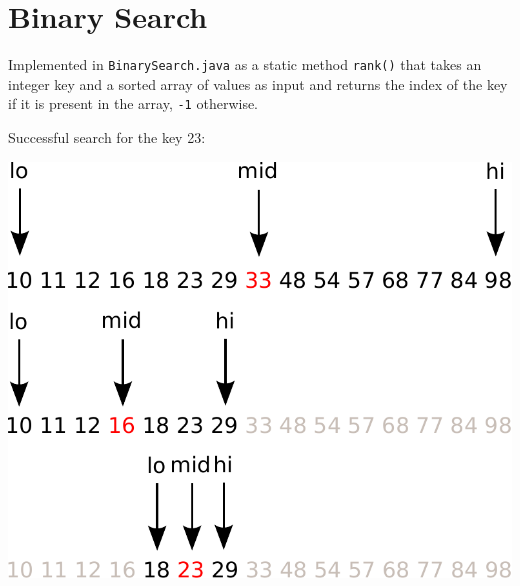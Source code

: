 \documentclass[8pt,a4paper,compress]{beamer}
\begin{document}
\section{Binary Search}
\begin{frame}[fragile]
\pause

Implemented in \lstinline$BinarySearch.java$ as a static method \lstinline$rank()$ that takes an integer key and a sorted array of values as input and returns the index of the key if it is present in the array, \lstinline$-1$ otherwise.

\pause
\smallskip

Successful search for the key 23:

\begin{center}
\includegraphics[scale=0.4]{./figures/bs1.pdf}
\end{center}
\end{frame}
\end{document}
